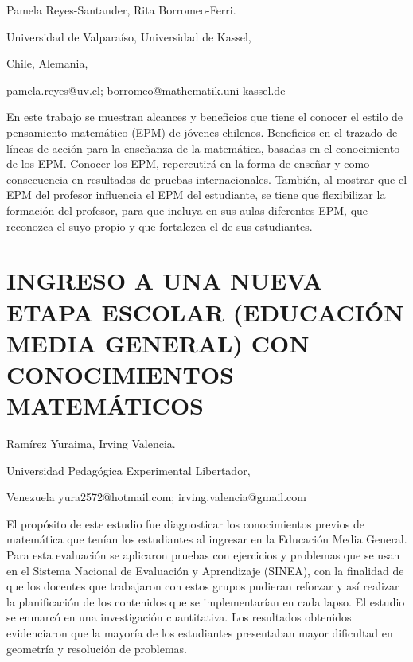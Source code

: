 \begin{datos}

Pamela Reyes-Santander, Rita Borromeo-Ferri.

Universidad de Valparaíso, Universidad de Kassel,

Chile, Alemania,

pamela.reyes@uv.cl; borromeo@mathematik.uni-kassel.de 

\end{datos}

En este trabajo se muestran alcances y beneficios que tiene el conocer
el estilo de pensamiento matemático (EPM) de jóvenes chilenos. Beneficios
en el trazado de líneas de acción para la enseñanza de la matemática,
basadas en el conocimiento de los EPM. Conocer los EPM, repercutirá
en la forma de enseñar y como consecuencia en resultados de pruebas
internacionales. También, al mostrar que el EPM del profesor influencia
el EPM del estudiante, se tiene que flexibilizar la formación del
profesor, para que incluya en sus aulas diferentes EPM, que reconozca
el suyo propio y que fortalezca el de sus estudiantes. 


\section{INGRESO A UNA NUEVA ETAPA ESCOLAR (EDUCACIÓN MEDIA GENERAL) CON CONOCIMIENTOS
MATEMÁTICOS }

\begin{datos}

Ramírez Yuraima, Irving Valencia.

Universidad Pedagógica Experimental Libertador,

Venezuela yura2572@hotmail.com; irving.valencia@gmail.com

\end{datos}

El propósito de este estudio fue diagnosticar los conocimientos previos
de matemática que tenían los estudiantes al ingresar en la Educación
Media General. Para esta evaluación se aplicaron pruebas con ejercicios
y problemas que se usan en el Sistema Nacional de Evaluación y Aprendizaje
(SINEA), con la finalidad de que los docentes que trabajaron con estos
grupos pudieran reforzar y así realizar la planificación de los contenidos
que se implementarían en cada lapso. El estudio se enmarcó en una
investigación cuantitativa. Los resultados obtenidos evidenciaron
que la mayoría de los estudiantes presentaban mayor dificultad en
geometría y resolución de problemas.

